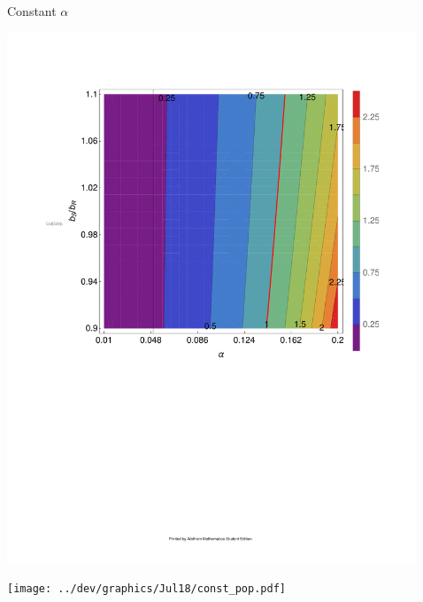 \documentclass[final]{beamer}
\newlength{\sepwid}
\newlength{\onecolwid}
\begin{document}
\begin{frame}[t]
\begin{columns}[t]
\begin{column}{\onecolwid}
\begin{alertblock}{Constant $\alpha$}
  \begin{center}
    \includegraphics[width=0.9\columnwidth]{../dev/graphics/Jul14/const_alpha_contour.pdf}

    \texttt{[image: ../dev/graphics/Jul18/const\_pop.pdf]}
  \end{center}

  \end{alertblock}

\end{column}
\begin{column}{\sepwid}\end{column} %


\begin{column}{\onecolwid}





\end{column}
\end{columns}
\end{frame}
\end{document}
